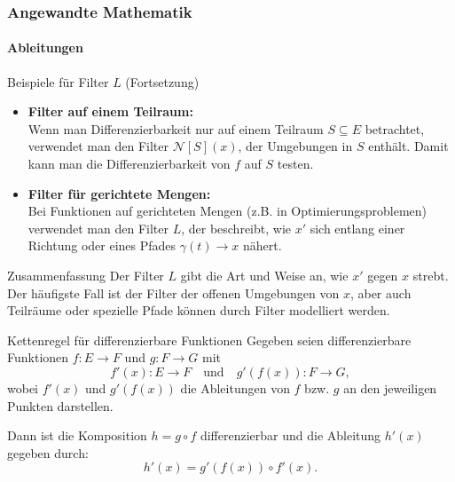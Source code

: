 \documentclass{beamer}
\begin{document}
\begin{frame}
    \frametitle{Angewandte Mathematik}
    \framesubtitle{Ableitungen}

\begin{block}{Beispiele für Filter \( L \) (Fortsetzung)}
  \begin{itemize}
      
    \item \textbf{Filter auf einem Teilraum:} \\
    Wenn man Differenzierbarkeit nur auf einem Teilraum \( S \subseteq E \) betrachtet, 
    verwendet man den Filter \( \mathcal{N}[S](x) \), der Umgebungen in \( S \) enthält. Damit kann man die Differenzierbarkeit von \( f \) auf \( S \) testen.
  
    \item \textbf{Filter für gerichtete Mengen:} \\
    Bei Funktionen auf gerichteten Mengen (z.B. in Optimierungsproblemen) verwendet man den Filter \( L \), der beschreibt, wie \( x' \) sich entlang einer Richtung oder eines Pfades \( \gamma(t) \to x \) nähert.
  \end{itemize}
\end{block}

\vspace{-0.5cm} %

\begin{block}{Zusammenfassung}
  Der Filter \( L \) gibt die Art und Weise an, wie \( x' \) gegen \( x \) strebt. Der häufigste Fall ist der Filter der offenen Umgebungen von \( x \), aber auch Teilräume oder spezielle Pfade können durch Filter modelliert werden.
\end{block}

\end{frame}





\begin{frame}
    \begin{block}{Kettenregel für differenzierbare Funktionen}
        Gegeben seien differenzierbare Funktionen \( f : E \rightarrow F \) und \( g : F \rightarrow G \) mit
        \[
        f'(x) : E \to F \quad \text{und} \quad g'(f(x)) : F \to G,
        \]
        wobei \( f'(x) \) und \( g'(f(x)) \) die Ableitungen von \( f \) bzw. \( g \) an den jeweiligen Punkten darstellen.

        Dann ist die Komposition \( h = g \circ f \) differenzierbar und die Ableitung \( h'(x) \) gegeben durch:
        \[
        h'(x) = g'(f(x)) \circ f'(x).
        \]
    \end{block}
\end{frame}
\end{document}
